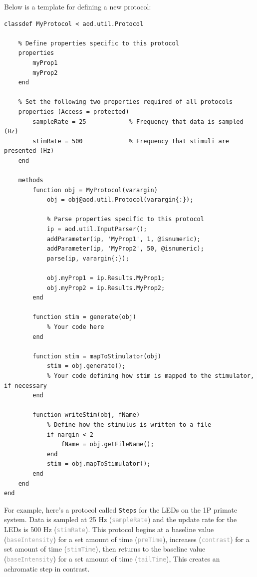 \documentclass[10pt]{exam}
\newcommand\aodclass[1]{\textcolor{codeblue}{\texttt{#1}}}
\newcommand\aodprop[1]{\textcolor{darkgray}{\texttt{#1}}}
\begin{document}
		\noindent Below is a template for defining a new protocol:
		\begin{lstlisting}[style=Matlab-editor, basicstyle=\mlttfamily\footnotesize]
classdef MyProtocol < aod.util.Protocol

	% Define properties specific to this protocol
	properties
		myProp1
		myProp2
	end 
	
	% Set the following two properties required of all protocols
	properties (Access = protected)
		sampleRate = 25            % Frequency that data is sampled (Hz)  	
		stimRate = 500             % Frequency that stimuli are presented (Hz)         
	end
	
	methods
		function obj = MyProtocol(varargin)
			obj = obj@aod.util.Protocol(varargin{:});
			
			% Parse properties specific to this protocol
			ip = aod.util.InputParser();
			addParameter(ip, 'MyProp1', 1, @isnumeric);
			addParameter(ip, 'MyProp2', 50, @isnumeric);
			parse(ip, varargin{:});
		
			obj.myProp1 = ip.Results.MyProp1;
			obj.myProp2 = ip.Results.MyProp2;
		end
	
		function stim = generate(obj)
			% Your code here
		end
	
		function stim = mapToStimulator(obj)
			stim = obj.generate();
			% Your code defining how stim is mapped to the stimulator, if necessary
		end
	
		function writeStim(obj, fName)
			% Define how the stimulus is written to a file
			if nargin < 2
				fName = obj.getFileName();
			end
			stim = obj.mapToStimulator();
		end
	end
end
		\end{lstlisting}
		For example, here's a protocol called \aodclass{Steps} for the LEDs on the 1P primate system. Data is sampled at 25 Hz (\aodprop{sampleRate}) and the update rate for the LEDs is 500 Hz (\aodprop{stimRate}). 
		This protocol begins at a baseline value (\aodprop{baseIntensity}) for a set amount of time (\aodprop{preTime}), increases (\aodprop{contrast}) for a set amount of time (\aodprop{stimTime}), then returns to the baseline value (\aodprop{baseIntensity}) for a set amount of time (\aodprop{tailTime}), This creates an achromatic step in contrast.
\end{document}
